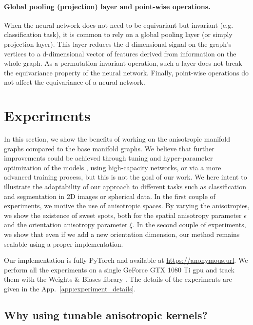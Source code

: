 \documentclass{article}
\begin{document}
\paragraph{Global pooling (projection) layer and point-wise operations.} When the neural network does not need to be equivariant but invariant (e.g. classification task), it is common to rely on a global pooling layer (or simply projection layer). This layer reduces the d-dimensional signal on the graph's vertices to a d-dimensional vector of features derived from information on the whole graph. As a permutation-invariant operation, such a layer does not break the equivariance property of the neural network. Finally, point-wise operations do not affect the equivariance of a neural network. %

\section{Experiments} \label{sec:experiments}

In this section, we show the benefits of working on the anisotropic manifold graphs compared to the base manifold graphs. We believe that further improvements could be achieved through tuning and hyper-parameter optimization of the models \citep{yu2020hyper}, using high-capacity networks, or via a more advanced training process, but this is not the goal of our work. We here intent to illustrate the adaptability of our approach to different tasks such as classification and segmentation in 2D images or spherical data. In the first couple of experiments, we motive the use of anisotropic spaces. By varying the anisotropies, we show the existence of sweet spots, both for the spatial anisotropy parameter $\epsilon$ and the orientation anisotropy parameter $\xi$. In the second couple of experiments, we show that even if we add a new orientation dimension, our method remains scalable using a proper implementation.

Our implementation is fully PyTorch \citep{pytorch} and available at \url{https://anonymous.url}.
We perform all the experiments on a single GeForce GTX 1080 Ti gpu and track them with the Weights \& Biases library \citep{wandb}. The details of the experiments are given in the App.~\ref{app:experiment_details}.

\subsection{Why using tunable anisotropic kernels?}
\end{document}
